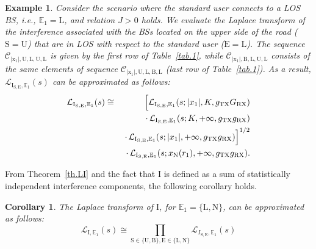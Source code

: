 \documentclass[10pt,journal,a4paper]{IEEEtran}
\newtheorem{corollary}{Corollary}[section]
\newtheorem{example}{Example}[section]
\begin{document}
\begin{example}
Consider the scenario where the standard user connects to a LOS BS, i.e., $\mathbb{E}_1 = \mathrm{L}$, and relation $J > 0$ holds.
We evaluate the Laplace transform of the interference associated with the BSs located on the upper side of the road ($\mathrm{S} = \mathrm{U}$) that are in LOS with respect to the standard user ($\mathrm{E} = \mathrm{L}$). The sequence $\mathcal{C}_{\mathrm{|x_1|,U,L,U,L}}$ is given by the first row of Table~\ref{tab.1}, while $\mathcal{C}_{\mathrm{|x_1|,B,L,U,L}}$ consists of the same elements of sequence $\mathcal{C}_{\mathrm{|x_1|,U,L,B,L}}$ (last row of Table~\ref{tab.1}). As a result, $\mathcal{L}_{\mathrm{I}_{\mathrm{S,E}},\mathbb{E}_1}(s)$ can be approximated as follows:
\setlength{\arraycolsep}{0.0em} 
\begin{eqnarray}
\mathcal{L}_{\mathrm{I}_{\mathrm{S,E}},\mathbb{E}_1}(s) &{}\cong{}& \Big[{\mathcal{L}_{\mathrm{I}_{\mathrm{S,E}},\mathbb{E}_1}(s;|x_1|,K,g_\mathrm{TX}G_\mathrm{RX})}\notag\\
&& \cdot \, {\mathcal{L}_{\mathrm{I}_{\mathrm{S,E}},\mathbb{E}_1}(s;K,+\infty,g_\mathrm{TX}g_\mathrm{RX})}\nonumber\\
&& \cdot \, {\mathcal{L}_{\mathrm{I}_{\mathrm{S,E}},\mathbb{E}_1}(s;|x_1|,+\infty,g_\mathrm{TX}g_\mathrm{RX})}\Big]^{1/2}\nonumber\\
&& \cdot \, {\mathcal{L}_{\mathrm{I}_{\mathrm{S,E}},\mathbb{E}_1}(s;x_\mathrm{N}(r_1),+\infty,g_\mathrm{TX}g_\mathrm{RX})}.
\end{eqnarray}
\end{example}

From Theorem~\ref{th.LI} and the fact that $\mathrm{I}$ is defined as a sum of statistically independent interference components, the following corollary holds.

\begin{corollary}\label{cor.lI}
The Laplace transform of $\mathrm{I}$, for $\mathbb{E}_1 = \{\mathrm{L},\mathrm{N}\}$, can be approximated as follows:
\begin{equation}
\mathcal{L}_\mathrm{I,\mathbb{E}_1}(s) \cong \prod_{\mathrm{S} \in \{\mathrm{U},\mathrm{B}\}, \mathrm{E} \in \{\mathrm{L},\mathrm{N}\}} \mathcal{L}_{I_{\mathrm{S},\mathrm{E}},\mathbb{E}_1}(s)
\end{equation}
\end{corollary}
\end{document}
